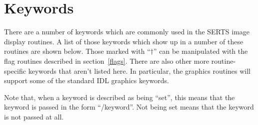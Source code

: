 \section{Keywords}
\label{keywords}

There are a number of keywords which are commonly used in the SERTS image
display routines.  A list of those keywords which show up in a number of these
routines are shown below.  Those marked with ``$\dagger$'' can be manipulated
with the flag routines described in section~\ref{flags}.  There are also other
more routine-specific keywords that aren't listed here.  In particular, the
graphics routines will support some of the standard IDL graphics keywords.

Note that, when a keyword is described as being ``set'', this means that the
keyword is passed in the form ``/keyword''.  Not being set means that the
keyword is not passed at all.


